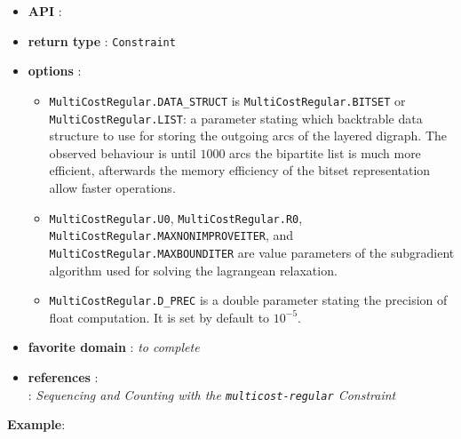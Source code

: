 \begin{itemize}
	\item \textbf{API} : 
	\item \textbf{return type} : \texttt{Constraint}
	\item \textbf{options} :
      \begin{itemize}
      \item \texttt{MultiCostRegular.DATA\_STRUCT} is  \texttt{MultiCostRegular.BITSET} or \texttt{MultiCostRegular.LIST}: a parameter stating which backtrable data structure to use for storing the outgoing arcs of the layered digraph. The observed behaviour is until $1000$ arcs the bipartite list is much more efficient, afterwards the memory efficiency of the bitset representation allow faster operations. 
      \item \texttt{MultiCostRegular.U0}, \texttt{MultiCostRegular.R0}, \texttt{MultiCostRegular.MAXNONIMPROVEITER}, and \texttt{MultiCostRegular.MAXBOUNDITER} are value parameters of the subgradient algorithm used for solving the lagrangean relaxation.
      \item \texttt{MultiCostRegular.D\_PREC} is a double parameter stating the precision of float computation. It is set by default to $10^{-5}$.
      \end{itemize}
	\item \textbf{favorite domain} : \emph{to complete}
	\item \textbf{references} :\\
       \cite{MenanaCPAIOR09}: \emph{Sequencing and Counting with the {\tt multicost-regular} Constraint}
\end{itemize}

\textbf{Example}:



